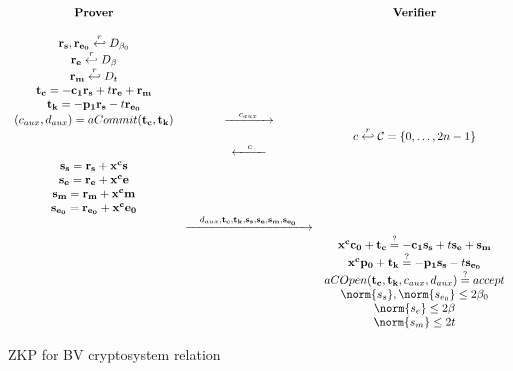\begin{figure}[h]
  \centering
  \begin{equation*}
    \begin{array}{c c c}
      \text{\textbf{Prover}} & & \text{\textbf{Verifier}} \\
      \\
      \mathbf{r_s,r_{e_0}} \randomsample D_{\beta_0} & & \\
      \mathbf{r_e} \randomsample D_{\beta} & & \\
      \mathbf{r_m} \randomsample D_{t} & & \\
      \mathbf{t_c} = \mathbf{-c_1r_s} + t\mathbf{r_e + r_m} & & \\
      \mathbf{t_k} = \mathbf{-p_1r_s} - t\mathbf{r_{e_0}} & & \\
      (c_{aux}, d_{aux}) = aCommit(\mathbf{t_c,t_k}) &
                                                       \xrightarrow{\hspace{1em}c_{aux}\hspace{1em}} & \\
                             & & c \randomsample \mathcal{C} = \left\{ 0,\dots, 2n -1  \right\}\\
                             &  \xleftarrow{\hspace{1em}c\hspace{1em}} & \\
      \mathbf{s_s = r_s + x^cs} & & \\
      \mathbf{s_e = r_e + x^ce} & & \\
      \mathbf{s_m = r_m + x^cm} & & \\
      \mathbf{s_{e_0} = r_{e_0} + x^ce_0} & & \\
                             & \xrightarrow{\hspace{1em}d_{aux}, \mathbf{t_c, t_k, s_s, s_e, s_m,
                               s_{e_0}}\hspace{1em}} & \\
                             & & \mathbf{x^cc_0} + \mathbf{t_c} \stackrel{?}{=} -\mathbf{c_1s_s} +t\mathbf{s_e} +
                                 \mathbf{s_m}\\
                             & & \mathbf{x^cp_0} + \mathbf{t_k} \stackrel{?}{=} -\mathbf{p_1s_s}
                                 -t\mathbf{s_{e_0}}\\
                             & & aCOpen(\mathbf{t_c, t_k}, c_{aux}, d_{aux}) \stackrel{?}{=} accept \\
                             & & \norm{s_s}, \norm{s_{e_0}} \leq 2\beta_0 \\
                             & & \norm{s_e} \leq 2\beta \\
                             & & \norm{s_m} \leq 2t
    \end{array}
  \end{equation*}
  \caption{ZKP for BV cryptosystem relation}
  \label{fig:belhamoudaProtocol}
\end{figure}



